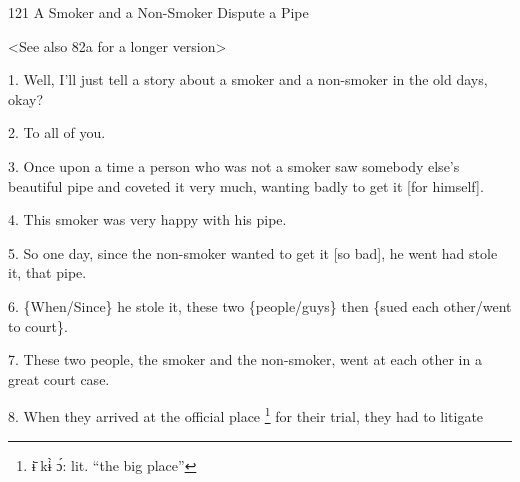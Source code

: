 
121 A Smoker and a Non-Smoker Dispute a Pipe

<See also 82a for a longer version>

1. Well, I'll just tell a story about a smoker and a non-smoker in the old days,
okay?

2. To all of you.

3. Once upon a time a person who was not a smoker saw somebody else's beautiful
pipe and coveted it very much, wanting badly to get it [for himself].

4. This smoker was very happy with his pipe.

5. So one day, since the non-smoker wanted to get it [so bad], he went had stole
it, that pipe.

6. \{When/Since\} he stole it, these two \{people/guys\} then \{sued each other/went
to court\}.

7. These two people, the smoker and the non-smoker, went at each other in a great
court case.

8. When they arrived at the official place \footnote{ɨ̄ kɨ̀ ɔ́: lit. ``the big place''} for their trial, they had to litigate

